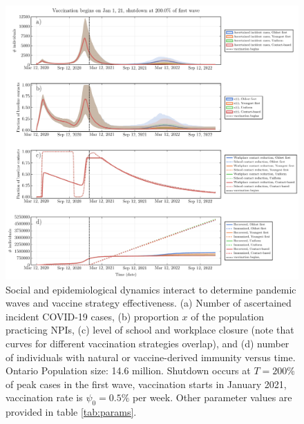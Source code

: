 \begin{figure}
\includegraphics[width=\textwidth]{chapter_1/ts_plot.pdf}
\caption{Social and epidemiological dynamics interact to determine pandemic waves and vaccine strategy effectiveness. (a) Number of ascertained incident COVID-19 cases, (b) proportion $x$ of the population practicing NPIs, (c) level of school and workplace closure (note that curves for different vaccination strategies overlap), and (d) number of individuals with natural or vaccine-derived immunity versus time.  Ontario Population size: 14.6 million. Shutdown occurs at $T = 200$\% of peak cases in the first wave, vaccination starts in January 2021, vaccination rate is $\psi_0 =0.5\%$ per week. Other parameter values are provided in table \ref{tab:params}.}
\label{fig2}  
\end{figure}

